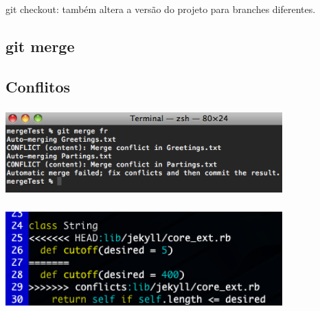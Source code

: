 \documentclass[aspectratio=169]{beamer}
\makeatletter
\newcommand*{\currentname}{\@currentlabelname}
\makeatother
\begin{document}
\begin{frame}
  \frametitle{\currentname}
  \begin{center}
    {\Huge git checkout: também altera a versão do projeto para branches diferentes.}
  \end{center}
\end{frame}

\subsection{git merge}
\begin{frame}
  \frametitle{\currentname}
  \begin{itemize}
  \end{itemize}
\end{frame}

\subsection{Conflitos}
\begin{frame}
  \frametitle{\currentname}
  \begin{center}
    \includegraphics[width=0.8\textwidth]{img/conflict.png}
  \end{center}
\end{frame}

\begin{frame}
  \frametitle{\currentname}
  \begin{center}
    \includegraphics[width=0.8\textwidth]{img/conflicts.png}
  \end{center}
\end{frame}
\end{document}
